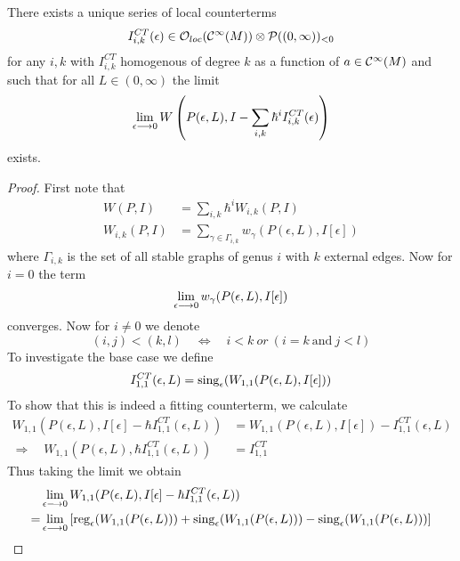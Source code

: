 \begin{theo}
  There exists a unique series of local counterterms
  \begin{equation}I_{i,k}^{CT}(\epsilon) \in \OO_{loc}(\Ci(M)) \otimes \mathcal{P}((0,\infty))_{<0}\end{equation}
  for any $i,k$ with $I_{i,k}^{CT}$ homogenous of degree $k$ as a function of $a \in \mathcal{C}^{\infty}(M)$ and such that for all $L \in (0,\infty)$ the limit
  \begin{equation}\lim_{\epsilon \lra 0} W\left(P(\epsilon, L), I - \sum_{i,k} \hbar^i I_{i,k}^{CT}(\epsilon)\right)\end{equation}
  exists.
\begin{proof}
  First note that
  \begin{align}
    W(P,I) &= \sum_{i,k} \hbar^i W_{i,k}(P,I) \\
    W_{i,k}(P,I) &= \sum_{\gamma \in \Gamma_{i,k}} w_\gamma (P(\epsilon, L), I[\epsilon])
  \end{align}
  where $\Gamma_{i,k}$ is the set of all stable graphs of genus $i$ with $k$ external edges. Now for $i = 0$ the term
  \begin{equation}\lim_{\epsilon \lra 0} w_\gamma (P(\epsilon, L), I[\epsilon])\end{equation}
  converges. Now for $i\neq 0$ we denote
  \begin{equation}(i,j) < (k,l) \quad \Leftrightarrow \quad i<k \ or \ (i=k \ \text{and} \ j<l)\end{equation}
  To investigate the base case we define
  \begin{equation}I_{1,1}^{CT}(\epsilon, L) = \sing_\epsilon(W_{1,1}(P(\epsilon, L), I[\epsilon]))\end{equation}
  To show that this is indeed a fitting counterterm, we calculate
  \begin{align}
    W_{1,1}(P(\epsilon,L), I[\epsilon] - \hbar I_{1,1}^{CT}(\epsilon,L)) &= W_{1,1}(P(\epsilon,L), I[\epsilon]) - I_{1,1}^{CT}(\epsilon,L)\\
    \Rightarrow \quad W_{1,1}(P(\epsilon,L), \hbar I_{1,1}^{CT}(\epsilon,L)) &= I_{1,1}^{CT}
  \end{align}
  Thus taking the limit we obtain
  \begin{align}
    &\lim_{\epsilon \lra 0} W_{1,1}(P(\epsilon,L), I[\epsilon] - \hbar I_{1,1}^{CT}(\epsilon,L)) \\
    = &\lim_{\epsilon \lra 0} \left[ \reg_\epsilon(W_{1,1}(P(\epsilon,L))) + \sing_\epsilon(W_{1,1}(P(\epsilon,L))) - \sing_\epsilon(W_{1,1}(P(\epsilon,L))) \right]

\end{align}
\end{proof}
\end{theo}
